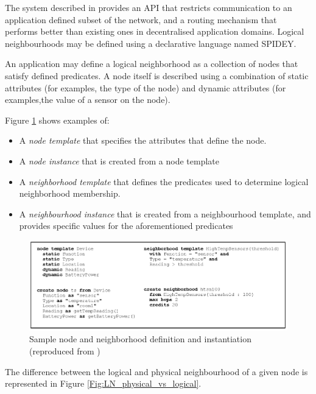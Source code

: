 The system described in \cite{mottola_LN:2006} provides an API that restricts 
communication to an application defined subset of the network, and a routing 
mechanism that performs better than existing ones in decentralised application 
domains. Logical neighbourhoods may be defined using a declarative language 
named SPIDEY.

An application may define a logical neighborhood as a collection of nodes that 
satisfy defined predicates. A node itself is described using a combination of 
static attributes (for examples, the type of the node) and dynamic attributes 
(for examples,the value of a sensor on the node).

Figure \ref{Fig:LN_templates_instances} shows examples of:
\begin{itemize} 
 \item A \emph{node template} that specifies the attributes that define the 
 node.
 \item A \emph{node instance} that is created from a node template
 \item A \emph{neighborhood template} that defines the predicates used to 
 determine logical neighborhood membership.
 \item A \emph{neighbourhood instance} that is created from a neighbourhood 
 template, and provides specific values for the aforementioned predicates
\end{itemize}  

\begin{figure}
\centering
\label{Fig:LN_templates_instances}
\includegraphics[scale=0.65]{img/LN_templates_instances.eps} \caption[Sample 
node and neighborhood definition and instantiation]{Sample node and 
neighborhood definition and instantiation (reproduced from \cite{mottola_LN:2006})}
\end{figure}


The difference between the logical and physical neighbourhood of a given node 
is represented in Figure \ref{Fig:LN_physical_vs_logical}.

